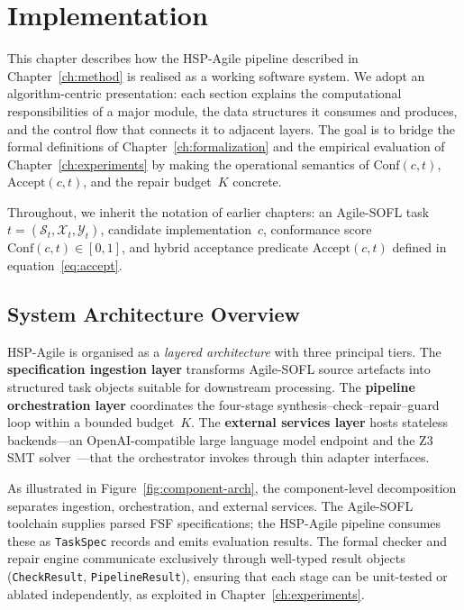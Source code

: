 
\chapter{Implementation}
\label{ch:implementation}

This chapter describes how the HSP-Agile pipeline described in
Chapter~\ref{ch:method} is realised as a working software system.
We adopt an algorithm-centric presentation: each section explains the
computational responsibilities of a major module, the data structures it
consumes and produces, and the control flow that connects it to adjacent
layers.  The goal is to bridge the formal definitions of
Chapter~\ref{ch:formalization} and the empirical evaluation of
Chapter~\ref{ch:experiments} by making the operational semantics of
$\mathrm{Conf}(c,t)$, $\mathrm{Accept}(c,t)$, and the repair budget~$K$
concrete.

Throughout, we inherit the notation of earlier chapters: an Agile-SOFL
task $t = (\mathcal{S}_t, \mathcal{X}_t, \mathcal{Y}_t)$, candidate
implementation~$c$, conformance score $\mathrm{Conf}(c,t) \in [0,1]$, and
hybrid acceptance predicate $\mathrm{Accept}(c,t)$ defined in
equation~\eqref{eq:accept}.

\section{System Architecture Overview}
\label{sec:impl:architecture}

HSP-Agile is organised as a \emph{layered architecture} with three principal
tiers.  The \textbf{specification ingestion layer} transforms Agile-SOFL
source artefacts into structured task objects suitable for downstream
processing.  The \textbf{pipeline orchestration layer} coordinates the
four-stage synthesis--check--repair--guard loop within a bounded budget~$K$.
The \textbf{external services layer} hosts stateless backends---an
OpenAI-compatible large language model endpoint and the Z3 SMT
solver~\citep{demoura2008z3,barrett2018smt}---that the orchestrator invokes
through thin adapter interfaces.

As illustrated in Figure~\ref{fig:component-arch}, the component-level
decomposition separates ingestion, orchestration, and external services.
The Agile-SOFL toolchain supplies parsed FSF specifications; the HSP-Agile
pipeline consumes these as \texttt{TaskSpec} records and emits evaluation
results.  The formal checker and repair engine communicate exclusively through
well-typed result objects (\texttt{CheckResult}, \texttt{PipelineResult}),
ensuring that each stage can be unit-tested or ablated independently, as
exploited in Chapter~\ref{ch:experiments}.

